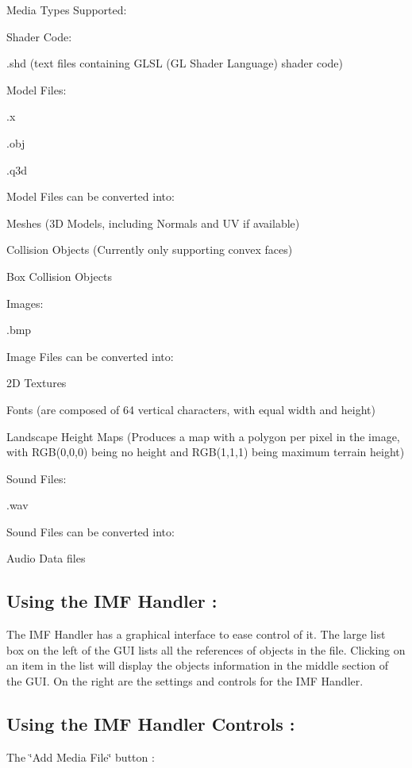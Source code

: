 Media Types Supported:\par
 Shader Code:\par
 .shd (text files containing GLSL (GL Shader Language) shader code)\par
 Model Files:\par
 .x\par
 .obj\par
 .q3d\par
 Model Files can be converted into:\par
 Meshes (3D Models, including Normals and UV if available)\par
 Collision Objects (Currently only supporting convex faces)\par
 Box Collision Objects \par
 Images:\par
 .bmp\par
 Image Files can be converted into:\par
 2D Textures\par
 Fonts (are composed of 64 vertical characters, with equal width and height)\par
 Landscape Height Maps (Produces a map with a polygon per pixel in the image, with RGB(0,0,0) being no height and RGB(1,1,1) being maximum terrain height)\par
 Sound Files: \par
 .wav\par
 Sound Files can be converted into:\par
 Audio Data files\par
 \par
 \hypertarget{_using_engine_page_IMFUse}{}\subsection{Using the IMF Handler :}\label{_using_engine_page_IMFUse}
The IMF Handler has a graphical interface to ease control of it. The large list box on the left of the GUI lists all the references of objects in the file. Clicking on an item in the list will display the objects information in the middle section of the GUI. On the right are the settings and controls for the IMF Handler. \hypertarget{_using_engine_page_IMFControls}{}\subsection{Using the IMF Handler Controls :}\label{_using_engine_page_IMFControls}
The \char`\"{}Add Media File\char`\"{} button :\par
